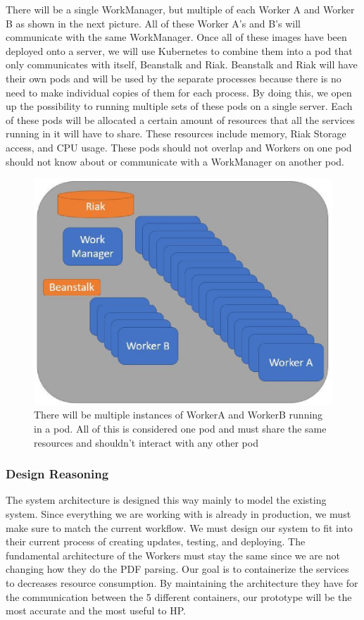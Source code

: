 \documentclass[onecolumn, draftclsnofoot,10pt, compsoc]{IEEEtran}
\begin{document}
There will be a single WorkManager, but multiple of each Worker A and Worker B as shown in the next picture. All of these Worker A’s and B’s will communicate with the same WorkManager. Once all of these images have been deployed onto a server, we will use Kubernetes to combine them into a pod that only communicates with itself, Beanstalk and Riak. Beanstalk and Riak will have their own pods and will be used by the separate processes because there is no need to make individual copies of them for each process. By doing this, we open up the possibility to running multiple sets of these pods on a single server. Each of these pods will be allocated a certain amount of resources that all the services running in it will have to share. These resources include memory, Riak Storage access, and CPU usage. These pods should not overlap and Workers on one pod should not know about or communicate with a WorkManager on another pod. 

\begin{figure}[h]
    \centering
    \includegraphics{prjct_arch_pod}
    \caption{There will be multiple instances of WorkerA and WorkerB running in a pod. All of this is considered one pod and must share the same resources and shouldn't interact with any other pod}
\end{figure}

\subsubsection{Design Reasoning}
The system architecture is designed this way mainly to model the existing system. Since everything we are working with is already in production, we must make sure to match the current workflow. We must design our system to fit into their current process of creating updates, testing, and deploying. The fundamental architecture of the Workers must stay the same since we are not changing how they do the PDF parsing. Our goal is to containerize the services to decreases resource consumption. By maintaining the architecture they have for the communication between the 5 different containers, our prototype will be the most accurate and the most useful to HP.
\end{document}
